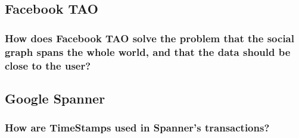 \documentclass{article}
\begin{document}
\subsection*{Facebook TAO}
\subsubsection*{How does Facebook TAO solve the problem that the social graph spans the whole world, and that the data should be close to the user?}


\subsection*{Google Spanner}
\subsubsection*{How are TimeStamps used in Spanner's transactions?}
\end{document}

